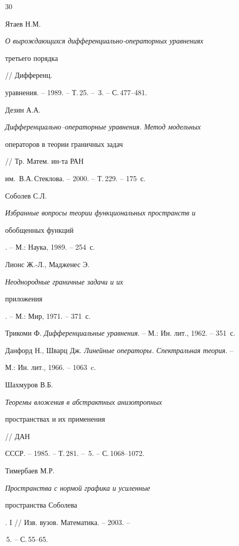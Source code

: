 \begin{thebibliography}{30}


Ятаев Н.М. {\em О вырождающихся дифференциально-операторных уравнениях


третьего порядка} // Дифференц.


уравнения. -- 1989. -- Т.\,25. -- \No\,3. -- С.\,477--481.







Дезин А.А. {\em Дифференциально--операторные уравнения. Метод модельных


операторов в теории граничных задач} // Тр. Матем. ин-та РАН


им.~В.А.\,Стеклова. -- 2000. -- Т.\,229. -- 175~с.







Соболев С.Л. {\em Избранные вопросы теории функциональных пространств и


обобщенных функций}. -- М.: Наука, 1989. -- 254~с.







Лионс Ж.-Л., Мадженес Э. {\em Неоднородные граничные задачи и их


приложения}. -- М.: Мир, 1971. -- 371~с.







Трикоми Ф. {\em Дифференциальные уравнения}. -- М.: Ин. лит., 1962. -- 351~с.







Данфорд Н., Шварц Дж. {\em Линейные операторы. Спектральная теория}. --


М.: Ин. лит., 1966. -- 1063~c.







Шахмуров В.Б. {\em Теоремы вложения в абстрактных анизотропных


пространствах и их применения} // ДАН


СССР. -- 1985. -- Т.\,281. -- \No\,5. -- С.\,1068--1072.







Тимербаев М.Р. {\em Пространства с нормой графика и усиленные


пространства Соболева}. I // Изв. вузов. Математика. -- 2003. --


\No\,5. -- С.\,55--65.





\end{thebibliography}





